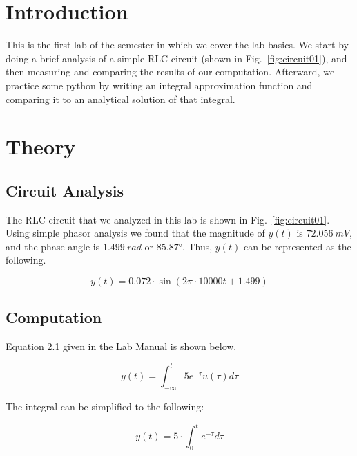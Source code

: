 \documentclass[11pt]{texMemo-gibbons}
\begin{document}
\maketitle

\section{Introduction}
\label{sec:introduction}

This is the first lab of the semester in which we cover
the lab basics. We start by doing a brief analysis of
a simple RLC circuit (shown in Fig.~\ref{fig:circuit01}),
and then measuring and comparing the results of our
computation. Afterward, we practice some python by writing
an integral approximation function and comparing it
to an analytical solution of that integral.

\section{Theory}
\label{sec:theory}

\subsection{Circuit Analysis}
\label{sec:theory_circuit}

The RLC circuit that we analyzed in this lab is shown
in Fig.~\ref{fig:circuit01}. Using simple phasor analysis
we found that the magnitude of $y(t)$ is $72.056~\si{mV}$,
and the phase angle is $1.499~\si{rad}$ or $\ang{85.87}$.
Thus, $y(t)$ can be represented as the following. 

\begin{equation}
  \label{eq:y(t)}
  y(t)=0.072\cdot \sin (2\pi \cdot 10000 t + 1.499)
\end{equation}

\subsection{Computation}
\label{sec:theory_computation}

Equation 2.1 given in the Lab Manual is shown below.

\begin{equation}
  \label{eq:analytical}
  y(t)=\int^t_{-\infty}5e^{-\tau}u(\tau)d\tau
\end{equation}

The integral can be simplified to the following:

\[ y(t)=5 \cdot \int^t_{0}e^{-\tau}d\tau \]
\end{document}
